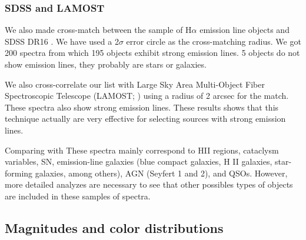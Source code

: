 \documentclass[fleqn,usenatbib]{mnras}
\begin{document}
\subsubsection{SDSS and LAMOST}

We also made cross-match between the sample of H{$\alpha$} emission line objects and SDSS DR16
\citep{Ahumada:2020}. We have used a 2$\sigma$ error circle as the cross-matching radius.
We got 200 spectra from which 195 objects exhibit strong emission lines. 5 objects do not 
show emission lines, they probably are stars or galaxies.

We also cross-correlate our list with Large Sky Area Multi-Object Fiber Spectroscopic Telescope
(LAMOST; \citealp{Wu:2011}) using a radius of 2 arcsec for the match.  These spectra also
show strong emission lines. These results shows that this technique actually are very effective
for selecting sources with strong emission lines.

Comparing with These spectra mainly correspond to HII regions, cataclysm variables, SN, emission-line galaxies 
(blue compact galaxies, H II galaxies, star-forming galaxies, among others), AGN (Seyfert 1 and 2), and QSOs. 
However, more detailed analyzes are necessary to see that other possibles types 
of objects are included in these samples of spectra.

\subsection{Magnitudes and color distributions}
\end{document}
